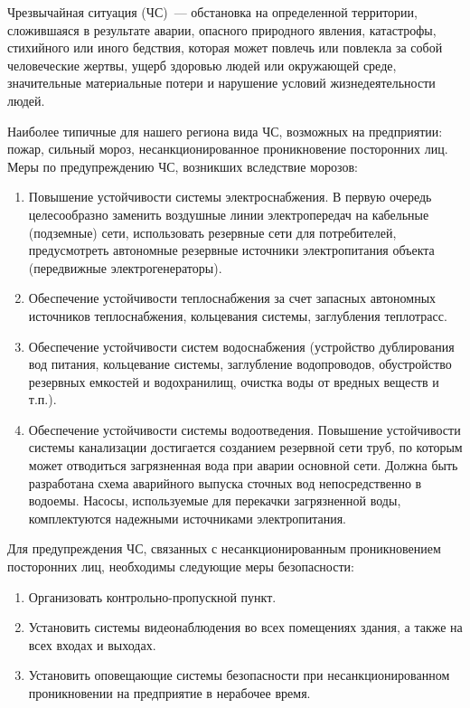 Чрезвычайная ситуация (ЧС)~--- обстановка на определенной территории, сложившаяся в результате аварии, опасного природного явления, катастрофы, стихийного или иного бедствия, которая может повлечь или повлекла за собой человеческие жертвы, ущерб здоровью людей или окружающей среде, значительные материальные потери и нарушение условий жизнедеятельности людей.

Наиболее типичные для нашего региона вида ЧС, возможных на предприятии: пожар, сильный мороз, несанкционированное проникновение посторонних лиц.
Меры по предупреждению ЧС, возникших вследствие морозов: 
\begin{enumerate}
[leftmargin=0pt,itemindent=\parindent+\labelwidth+\labelsep]
    \item Повышение устойчивости системы электроснабжения. В первую очередь целесообразно заменить воздушные линии электропередач на кабельные (подземные) сети, использовать резервные сети для потребителей, предусмотреть автономные резервные источники электропитания объекта (передвижные электрогенераторы).
    \item Обеспечение устойчивости теплоснабжения за счет запасных автономных источников теплоснабжения, кольцевания системы, заглубления теплотрасс.
    \item Обеспечение устойчивости систем водоснабжения (устройство дублирования вод питания, кольцевание системы, заглубление водопроводов, обустройство резервных емкостей и водохранилищ, очистка воды от вредных веществ и т.п.).
    \item Обеспечение устойчивости системы водоотведения. 
    Повышение устойчивости системы канализации достигается созданием резервной сети труб, по которым может отводиться загрязненная вода при аварии основной сети. 
    Должна быть разработана схема аварийного выпуска сточных вод непосредственно в водоемы. Насосы, используемые для перекачки загрязненной воды, комплектуются надежными источниками электропитания.
\end{enumerate}

Для предупреждения ЧС, связанных с несанкционированным проникновением посторонних лиц, необходимы следующие меры безопасности: 
\begin{enumerate}
    \item Организовать контрольно-пропускной пункт.
    \item Установить системы видеонаблюдения во всех помещениях здания, а также на всех входах и выходах.
    \item Установить оповещающие системы безопасности при несанкционированном проникновении на предприятие в нерабочее время.
\end{enumerate}

